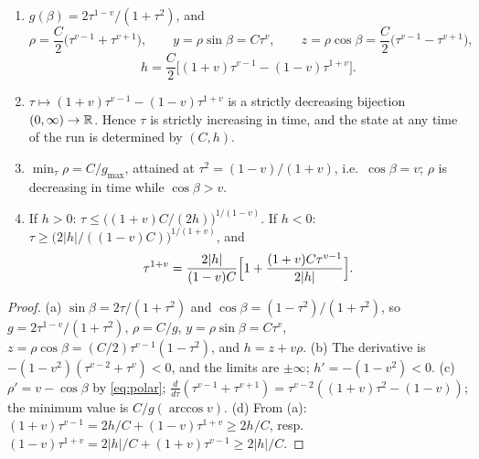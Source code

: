 \begin{lemma}\label{lem:T1-coord}
\begin{enumerate}
\item[(a)] $g(\beta)=2\tau^{1-v}/(1+\tau^2)$, and
\[
\rho=\frac C2\bigl(\tau^{v-1}+\tau^{v+1}\bigr),\qquad y=\rho\sin\beta=C\tau^v,\qquad z=\rho\cos\beta=\frac C2\bigl(\tau^{v-1}-\tau^{v+1}\bigr),
\]
\[
h=\frac C2\bigl[(1+v)\tau^{v-1}-(1-v)\tau^{1+v}\bigr].
\]
\item[(b)] $\tau\mapsto(1+v)\tau^{v-1}-(1-v)\tau^{1+v}$ is a strictly decreasing bijection $(0,\infty)\to\mathbb{R}$. Hence $\tau$ is strictly
increasing in time, and the state at any time of the run is determined by $(C,h)$.
\item[(c)] $\min_\tau\rho=C/g_{\max}$, attained at $\tau^2=(1-v)/(1+v)$, i.e.\ $\cos\beta=v$; $\rho$ is decreasing in time while
$\cos\beta>v$.
\item[(d)] If $h>0$: $\tau\le\bigl((1+v)C/(2h)\bigr)^{1/(1-v)}$. If $h<0$: $\tau\ge\bigl(2|h|/((1-v)C)\bigr)^{1/(1+v)}$, and
\[
\tau^{1+v}=\frac{2|h|}{(1-v)C}\Bigl[1+\frac{(1+v)C\tau^{v-1}}{2|h|}\Bigr].
\]
\end{enumerate}
\end{lemma}
\begin{proof}
(a) $\sin\beta=2\tau/(1+\tau^2)$ and $\cos\beta=(1-\tau^2)/(1+\tau^2)$, so $g=2\tau^{1-v}/(1+\tau^2)$, $\rho=C/g$, $y=\rho\sin\beta=C\tau^v$,
$z=\rho\cos\beta=(C/2)\tau^{v-1}(1-\tau^2)$, and $h=z+v\rho$. (b) The derivative is $-(1-v^2)(\tau^{v-2}+\tau^v)<0$, and the limits are
$\pm\infty$; $h'=-(1-v^2)<0$. (c) $\rho'=v-\cos\beta$ by \eqref{eq:polar}; $\frac d{d\tau}(\tau^{v-1}+\tau^{v+1})=\tau^{v-2}((1+v)\tau^2-(1-v))$;
the minimum value is $C/g(\arccos v)$. (d) From (a): $(1+v)\tau^{v-1}=2h/C+(1-v)\tau^{1+v}\ge2h/C$, resp.\
$(1-v)\tau^{1+v}=2|h|/C+(1+v)\tau^{v-1}\ge2|h|/C$.
\end{proof}

